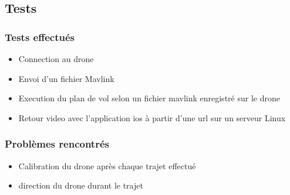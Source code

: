 \documentclass{beamer}
\begin{document}
	\begin{frame}
	\section{Tests}
		\begin{center}
		\frametitle{Tests effectués}
           	\begin{itemize}
                \item Connection au drone
                \item Envoi d'un fichier Mavlink
                \item Execution du plan de vol selon un fichier mavlink enregistré sur le drone
                \item Retour video avec l'application ios à partir d'une url sur un serveur Linux
            \end{itemize}
		\end{center}
	\end{frame}
	
		\begin{frame}
		\begin{center}
		\frametitle{Problèmes rencontrés}
             \begin{itemize}
                \item Calibration du drone après chaque trajet effectué
                \item direction du drone durant le trajet
            \end{itemize}
		\end{center}
	\end{frame}
	
\end{document}
